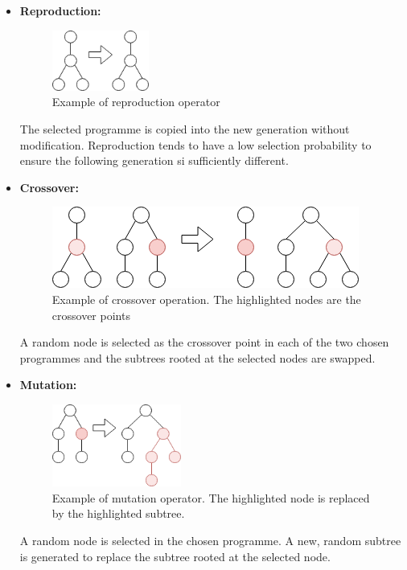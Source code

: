 \documentclass{article}
\begin{document}
			\begin{itemize}
				\item \textbf{Reproduction:} 
				
				\begin{figure}[h]
					\centering
					\includegraphics[width=0.3\textwidth]{5_reproduction}
					\caption{Example of reproduction operator}
					\label{fig:reproduction}
				\end{figure}
				
				The selected programme is copied into the new generation without modification. Reproduction tends to have a low selection probability to ensure the following generation si sufficiently different.
				
				\item \textbf{Crossover:} 
				
				\begin{figure}[h]
					\centering
					\includegraphics[height=0.2\textwidth]{6_crossover}
					\caption{Example of crossover operation. The highlighted nodes are the crossover points}
					\label{fig:crossover}
				\end{figure}
				
				A random node is selected as the crossover point in each of the two chosen programmes and the subtrees rooted at the selected nodes are swapped.

				
				\item \textbf{Mutation:} 
				
				\begin{figure}[h]
					\centering
					\includegraphics[width=0.4\textwidth]{7_mutation}
					\caption{Example of mutation operator. The highlighted node is replaced by the highlighted subtree.}
					\label{fig:mutation}
				\end{figure}
				
				A random node is selected in the chosen programme. A new, random subtree is generated to replace the subtree rooted at the selected node.
			\end{itemize}
			
\end{document}
